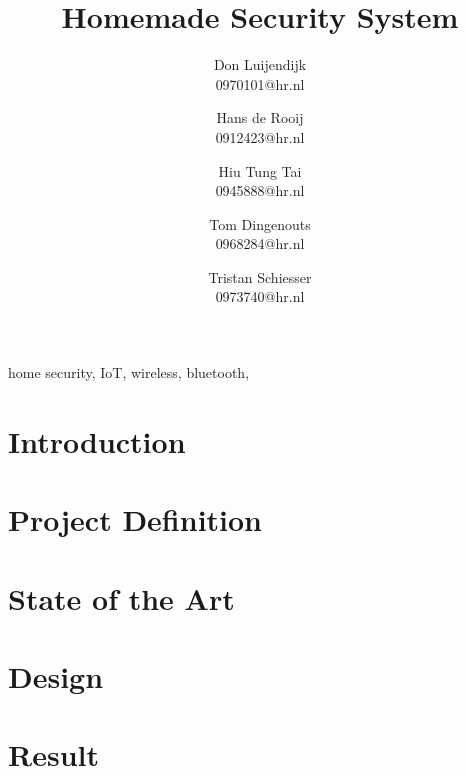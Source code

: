 \documentclass[conference]{IEEEtran}
\title{Homemade Security System}
\author{
	Don Luijendijk\\
	0970101@hr.nl
	\and 
	Hans de Rooij\\
	0912423@hr.nl
	\and 
	Hiu Tung Tai	\\
	0945888@hr.nl
	\and 
	Tom Dingenouts\\
	0968284@hr.nl
	\and 
	Tristan Schiesser\\
	0973740@hr.nl
}
\begin{document}
	\maketitle
	
	
	
	\begin{IEEEkeywords}
	home security, IoT, wireless, bluetooth, 
	\end{IEEEkeywords}
	
	\section{Introduction}
	
	
	\section{Project Definition}
	
	
	\section{State of the Art}
	
	
	\section{Design}
	
	
	\section{Result}
	
	
	
		
		
\end{document}

